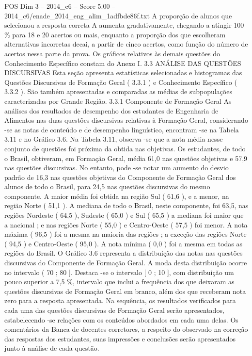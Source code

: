 \begin{textsample}{POS Dim 3 – 2014\_c6 – Score 5.00 – 2014\_c6/enade\_2014\_eng\_alim\_1adfbde86f.txt}
A proporção de alunos que selecionou a resposta correta A aumenta gradativamente, chegando a atingir 100 \% para 18 e 20 acertos ou mais, enquanto a proporção dos que escolheram alternativas incorretas decai, a partir de cinco acertos, como função do número de acertos nessa parte da prova.
Os gráficos relativos às demais questões do Conhecimento Específico constam do Anexo I. 3.3 ANÁLISE DAS QUESTÕES DISCURSIVAS Esta seção apresenta estatísticas selecionadas e histogramas das Questões Discursivas de Formação Geral ( 3.3.1 ) e Conhecimento Específico ( 3.3.2 ).
São também apresentadas e comparadas as médias de subpopulações caracterizadas por Grande Região. 3.3.1 Componente de Formação Geral As análises dos resultados de desempenho dos estudantes de Engenharia de Alimentos nas duas questões discursivas relativas à Formação Geral, considerando -se as notas de conteúdo e de desempenho linguístico, encontram -se na Tabela 3.11 e no Gráfico 3.6.
Na Tabela 3.11, observa -se que a nota média nesse conjunto de questões foi próxima da obtida nas objetivas.
Os estudantes, de todo o Brasil, obtiveram, em Formação Geral, média 61,0 nas questões objetivas e 57,9 nas questões discursivas.
No entanto, pode -se notar um aumento do desvio padrão de 16,3 nas questões objetivas do Componente de Formação Geral dos alunos de todo o Brasil, para 24,5 nas questões discursivas do mesmo componente.
A maior média foi obtida na região Sul ( 61,6 ), e a menor, na região Norte ( 51,1 ).
A mediana de todo o Brasil, neste componente, foi 63,5, nas regiões Nordeste ( 64,5 ), Sudeste ( 65,0 ) e Sul ( 65,5 ) a mediana foi maior que a nacional ; e nas regiões Norte ( 55,0 ) e Centro-Oeste ( 57,5 ) foi menor.
A nota máxima ( 96,5 ) foi a mesma na maioria das regiões ; a exceção das regiões Norte ( 94,5 ) e Centro-Oeste ( 95,0 ).
A nota mínima ( 0,0 ) foi a mesma em todas as regiões do Brasil.
O Gráfico 3.6 representa a distribuição das notas nas questões discursivas do Componente de Formação Geral.
A moda desta distribuição ocorre no intervalo ( 70 ; 80 ].
Destaca -se o intervalo [ 0 ; 10 ], com distribuição um pouco superior a 7,5 \%, intervalo que inclui a frequência dos que deixaram as questões discursivas de Formação Geral em branco, além dos que receberam nota zero para a resposta apresentada.
Na sequência, os resultados verificados para cada uma das questões discursivas de Formação Geral serão apresentados, estabelecendo -se relações com os conteúdos abordados em cada uma delas.
Os comentários da Banca de docentes corretores, a respeito do observado na correção das respostas dos estudantes, suas impressões e conclusões serão apresentados junto à análise de cada questão.

\end{textsample}
